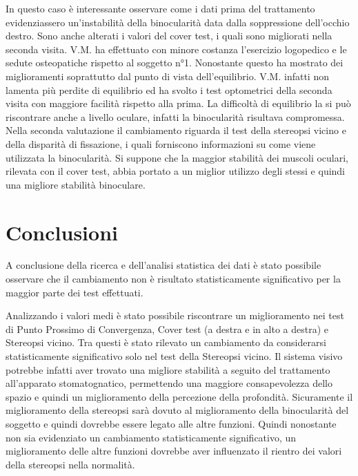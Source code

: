 In questo caso è interessante osservare come i dati prima del trattamento evidenziassero un’instabilità della binocularità data dalla soppressione dell’occhio destro. Sono anche alterati i valori del cover test, i quali sono migliorati nella seconda visita. V.M. ha effettuato con minore costanza l’esercizio logopedico e le sedute osteopatiche rispetto al soggetto n°1. Nonostante questo ha mostrato dei miglioramenti soprattutto dal punto di vista dell’equilibrio. V.M. infatti non lamenta più perdite di equilibrio ed ha svolto i test optometrici della seconda visita con maggiore facilità rispetto alla prima. La difficoltà di equilibrio la si può riscontrare anche a livello oculare, infatti la binocularità risultava compromessa. Nella seconda valutazione il cambiamento riguarda il test della stereopsi vicino e della disparità di fissazione, i quali forniscono informazioni su come viene utilizzata la binocularità. Si suppone che la maggior stabilità dei muscoli oculari, rilevata con il cover test, abbia portato a un miglior utilizzo degli stessi e quindi una migliore stabilità binoculare.

\section{Conclusioni}

A conclusione della ricerca e dell’analisi statistica dei dati è stato possibile osservare che il cambiamento non è risultato statisticamente significativo per la maggior parte dei test effettuati.

Analizzando i valori medi è stato possibile riscontrare un miglioramento nei test di Punto Prossimo di Convergenza, Cover test (a destra e in alto a destra) e Stereopsi vicino. Tra questi è stato rilevato un cambiamento da considerarsi statisticamente significativo solo nel test della Stereopsi vicino. Il sistema visivo potrebbe infatti aver trovato una migliore stabilità a seguito del trattamento all’apparato stomatognatico, permettendo una maggiore consapevolezza dello spazio e quindi un miglioramento della percezione della profondità. Sicuramente il miglioramento della stereopsi sarà dovuto al miglioramento della binocularità del soggetto e quindi dovrebbe essere legato alle altre funzioni. Quindi nonostante non sia evidenziato un cambiamento statisticamente significativo, un miglioramento delle altre funzioni dovrebbe aver influenzato il rientro dei valori della stereopsi nella normalità.
 

